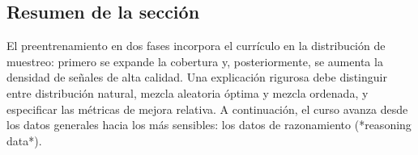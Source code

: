 \subsection{Resumen de la sección}

El preentrenamiento en dos fases incorpora el currículo en la distribución de muestreo: primero se expande la cobertura y, posteriormente, se aumenta la densidad de señales de alta calidad. Una explicación rigurosa debe distinguir entre distribución natural, mezcla aleatoria óptima y mezcla ordenada, y especificar las métricas de mejora relativa. A continuación, el curso avanza desde los datos generales hacia los más sensibles: los datos de razonamiento (*reasoning data*).
